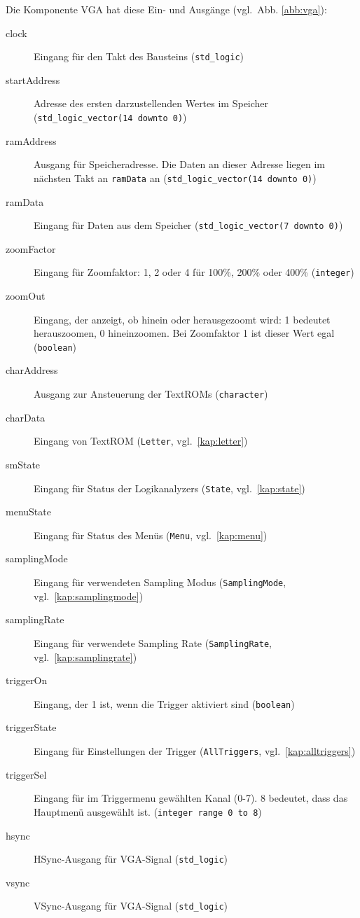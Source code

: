 \documentclass[IN,ngerman,utf8,12pt]{tumbook}
\newcommand{\vgl}{vgl.\ }
\begin{document}
Die Komponente VGA hat diese Ein- und Ausgänge (\vgl Abb. \ref{abb:vga}):
\begin{description}
    \item[clock] Eingang für den Takt des Bausteins (\texttt{std\_logic})
    \item[startAddress] Adresse des ersten darzustellenden Wertes im Speicher \\
        (\texttt{std\_logic\_vector(14 downto 0)})
    \item[ramAddress] Ausgang für Speicheradresse. Die Daten an dieser Adresse liegen im nächsten Takt an \texttt{ramData} an (\texttt{std\_logic\_vector(14 downto 0)})
    \item[ramData] Eingang für Daten aus dem Speicher (\texttt{std\_logic\_vector(7 downto 0)})
    \item[zoomFactor] Eingang für Zoomfaktor: 1, 2 oder 4 für 100\%, 200\% oder 400\% (\texttt{integer})
    \item[zoomOut] Eingang, der anzeigt, ob hinein oder herausgezoomt wird: 1 bedeutet herauszoomen, 0 hineinzoomen.
        Bei Zoomfaktor 1 ist dieser Wert egal (\texttt{boolean})
    \item[charAddress] Ausgang zur Ansteuerung der TextROMs (\texttt{character})
    \item[charData] Eingang von TextROM (\texttt{Letter}, \vgl \ref{kap:letter})
    \item[smState] Eingang für Status der Logikanalyzers (\texttt{State}, \vgl \ref{kap:state})
    \item[menuState] Eingang für Status des Menüs (\texttt{Menu}, \vgl \ref{kap:menu})
    \item[samplingMode] Eingang für verwendeten Sampling Modus (\texttt{SamplingMode}, \vgl \ref{kap:samplingmode})
    \item[samplingRate] Eingang für verwendete Sampling Rate (\texttt{SamplingRate}, \vgl \ref{kap:samplingrate})
    \item[triggerOn] Eingang, der 1 ist, wenn die Trigger aktiviert sind (\texttt{boolean})
    \item[triggerState] Eingang für Einstellungen der Trigger (\texttt{AllTriggers}, \vgl \ref{kap:alltriggers})
    \item[triggerSel] Eingang für im Triggermenu gewählten Kanal (0-7). 8 bedeutet, dass das Hauptmenü ausgewählt ist. (\texttt{integer range 0 to 8})
    \item[hsync] HSync-Ausgang für VGA-Signal (\texttt{std\_logic})
    \item[vsync] VSync-Ausgang für VGA-Signal (\texttt{std\_logic})

\end{description}
\end{document}
